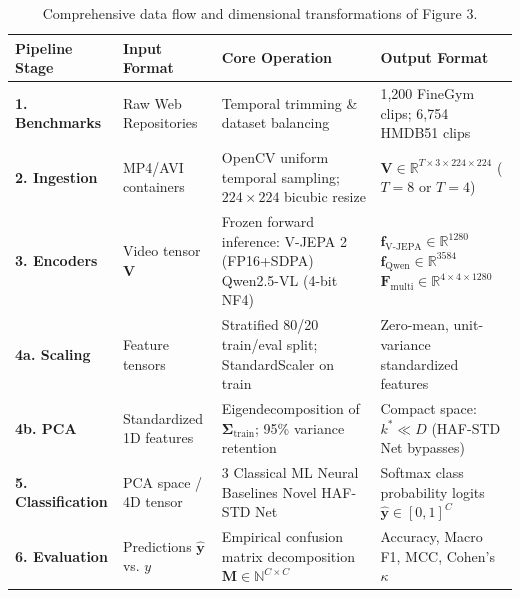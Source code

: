 \documentclass[a4paper, 11pt]{article}
\begin{document}
\begin{table}[h!]
\centering
\small
\renewcommand{\arraystretch}{1.25}
\begin{tabularx}{\textwidth}{p{2.8cm} p{3.2cm} p{4.2cm} X}
\toprule
\textbf{Pipeline Stage} & \textbf{Input Format} & \textbf{Core Operation} & \textbf{Output Format} \\
\midrule
\textbf{1. Benchmarks} & Raw Web Repositories & Temporal trimming \& dataset balancing & 1,200 FineGym clips; 6,754 HMDB51 clips \\
\midrule
\textbf{2. Ingestion} & MP4/AVI containers & OpenCV uniform temporal sampling; $224 \times 224$ bicubic resize & $\mathbf{V} \in \mathbb{R}^{T \times 3 \times 224 \times 224}$ ($T=8$ or $T=4$) \\
\midrule
\textbf{3. Encoders} & Video tensor $\mathbf{V}$ & Frozen forward inference: \newline V-JEPA 2 (FP16+SDPA) \newline Qwen2.5-VL (4-bit NF4) & $\mathbf{f}_{\text{V-JEPA}} \in \mathbb{R}^{1280}$ \newline $\mathbf{f}_{\text{Qwen}} \in \mathbb{R}^{3584}$ \newline $\mathbf{F}_{\text{multi}} \in \mathbb{R}^{4 \times 4 \times 1280}$ \\
\midrule
\textbf{4a. Scaling} & Feature tensors & Stratified 80/20 train/eval split; StandardScaler on train & Zero-mean, unit-variance standardized features \\
\midrule
\textbf{4b. PCA} & Standardized 1D features & Eigendecomposition of $\mathbf{\Sigma}_{\text{train}}$; 95\% variance retention & Compact space: $k^* \ll D$ (HAF-STD Net bypasses) \\
\midrule
\textbf{5. Classification} & PCA space / 4D tensor & 3 Classical ML \newline 5 Neural Baselines \newline 1 Novel HAF-STD Net & Softmax class probability logits $\hat{\mathbf{y}} \in [0, 1]^C$ \\
\midrule
\textbf{6. Evaluation} & Predictions $\hat{\mathbf{y}}$ vs. $y$ & Empirical confusion matrix decomposition $\mathbf{M} \in \mathbb{N}^{C \times C}$ & Accuracy, Macro F1, MCC, Cohen's $\kappa$ \\
\bottomrule
\end{tabularx}
\caption{Comprehensive data flow and dimensional transformations of Figure 3.}
\end{table}
\end{document}
